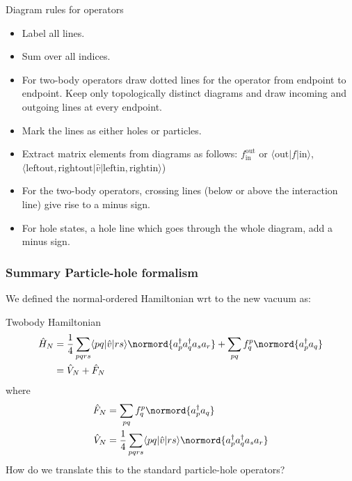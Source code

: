 \documentclass[compress]{beamer}
\newcommand*{\ket}[1]{|#1\rangle}
\newcommand*{\bra}[1]{\langle#1|}
\begin{document}
\begin{frame}{Diagram rules for operators}
    \begin{itemize}
        \item Label all lines.
        \item Sum over all indices. 
        \item For two-body operators draw dotted lines for the operator from endpoint to endpoint. 
Keep only topologically distinct diagrams and draw incoming and outgoing lines at every endpoint.
\item Mark the lines as either holes or particles. 
        \item Extract matrix elements from diagrams as follows: $f_{\mathrm{in}}^{\mathrm{out}}$ or 
$\langle \mathrm{out}|f|\mathrm{in}\rangle$, 
            $\bra{\mathrm{leftout, rightout}}\hat{v}\ket{\mathrm{leftin, rightin}}$)
\item For the two-body operators, crossing lines (below or above the interaction line) 
give rise to a minus sign.
\item For hole states, a hole line which goes through the whole diagram, add a minus sign.  
    \end{itemize}
\end{frame}





\frame
{
  \frametitle{Summary Particle-hole formalism}
\begin{small}
{\scriptsize
We defined the normal-ordered Hamiltonian wrt to the new vacuum as:
    \begin{block}{Twobody Hamiltonian}
    \begin{align*}
        \hat{H}_N &= 
            \frac{1}{4} \sum_{pqrs} \bra{pq}\hat{v}\ket{rs} \normord{a^\dagger_p a^\dagger_q a_s  a_r} 
            + \sum_{pq} f_q^p \normord{a^\dagger_p a_q} \\
        &= \hat{V}_N + \hat{F}_N
    \end{align*}
    where
    \begin{subequations}
    \begin{align*}
        \hat{F}_N &= \sum_{pq} f_q^p \normord{a^\dagger_p a_q} \\
        \hat{V}_N &= \frac{1}{4} \sum_{pqrs} \bra{pq}\hat{v}\ket{rs} \normord{a^\dagger_p a^\dagger_q a_s  a_r} \\
    \end{align*}
    \end{subequations}
How do we translate this to the standard particle-hole operators?
    \end{block}
}
\end{small}
}
\end{document}
